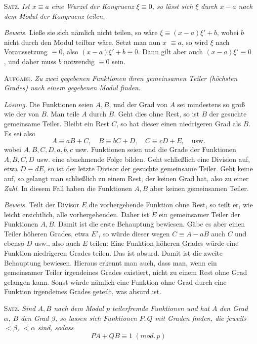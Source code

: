 \textsc{Satz.} \emph{Ist $x\equiv a$ eine Wurzel der Kongruenz $\xi\equiv0$, so lässt sich $\xi$ durch $x-a$ nach dem Modul der Kongruenz teilen.}

\emph{Beweis.} Ließe sie sich nämlich nicht teilen, so wäre $\xi\equiv(x-a)\xi'+b$, wobei $b$ nicht durch den Modul teilbar wäre. Setzt man nun $x$ $\equiv a$, so wird $\xi$ nach Voraussetzung $\equiv0$, also $(x-a)\xi'+b\equiv0$. Dann gilt aber auch $(x-a)\xi'\equiv0$, und daher muss $b$ notwendig $\equiv0$ sein.

\textsc{Aufgabe.} \emph{Zu zwei gegebenen Funktionen ihren gemeinsamen Teiler (höchsten Grades) nach einem gegebenen Modul finden.}

\emph{Lösung.} Die Funktionen seien $A,B$, und der Grad von $A$ sei mindestens so groß wie der von $B$. Man teile $A$ durch $B$. Geht dies ohne Rest, so ist $B$ der gesuchte gemeinsame Teiler. Bleibt ein Rest $C$, so hat dieser einen niedrigeren Grad als $B$. Es sei also
\[
A\equiv aB+C,\quad B\equiv bC+D,\quad C\equiv cD+E,\quad\text{usw.}
\]
wobei $A,B,C,D,a,b,c$ usw. Funktionen seien und die Grade der Funktionen $A,B,C,D$ usw. eine abnehmende Folge bilden. Geht schließlich eine Division auf, etwa $D\equiv dE$, so ist der letzte Divisor der gesuchte gemeinsame Teiler. Geht keine auf, so gelangt man schließlich zu einem Rest, der keinen Grad hat,
also zu einer \emph{Zahl}. In diesem Fall haben die Funktionen $A,B$ aber keinen gemeinsamen Teiler.

\emph{Beweis.} Teilt der Divisor $E$ die vorhergehende Funktion ohne Rest, so teilt er, wie leicht ersichtlich, alle vorhergehenden. Daher ist $E$ ein gemeinsamer Teiler der Funktionen $A,B$. Damit ist die erste Behauptung bewiesen. Gäbe es aber einen Teiler höheren Grades, etwa $E'$, so würde dieser wegen $C\equiv A-aB$ auch $C$ und ebenso $D$ usw., also auch $E$ teilen: Eine Funktion höheren Grades würde eine Funktion niedrigeren Grades teilen. Das ist absurd. Damit ist die zweite Behauptung bewiesen. Hieraus erkennt man auch, dass man, wenn ein gemeinsamer Teiler irgendeines Grades existiert, nicht zu einem Rest ohne Grad gelangen kann. Sonst würde nämlich eine Funktion ohne Grad durch eine Funktion irgendeines Grades geteilt, was absurd ist.

\textsc{Satz.} \emph{Sind $A,B$ nach dem Modul $p$ teilerfremde Funktionen und hat $A$ den Grad $\alpha$, $B$ den Grad $\beta$, so lassen sich Funktionen $P,Q$ mit Graden finden, die jeweils $<\beta$, $<\alpha$ sind, sodass}
\[
PA+QB\equiv1\;(\mathit{mod.}\,p)
\]

